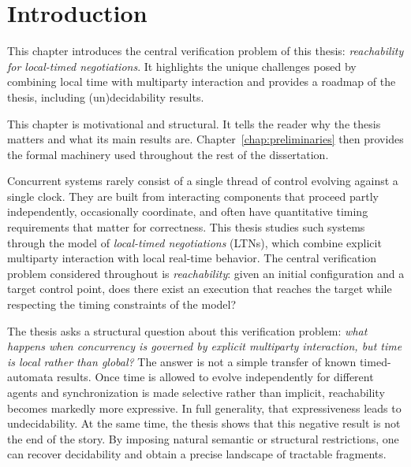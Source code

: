 

\chapter{Introduction}
\label{chap:intro}

\begin{tcolorbox}[width=\textwidth,colback={LightSteelBlue1}]
This chapter introduces the central verification problem of this thesis: \emph{reachability for local-timed negotiations}. It highlights the unique challenges posed by combining local time with multiparty interaction and provides a roadmap of the thesis, including (un)decidability results.
\end{tcolorbox}    

\noindent This chapter is motivational and structural. It tells the reader why the thesis matters and what its main results are. Chapter~\ref{chap:preliminaries} then provides the formal machinery used throughout the rest of the dissertation.

Concurrent systems rarely consist of a single thread of control evolving against a single clock. They are built from interacting components that proceed partly independently, occasionally coordinate, and often have quantitative timing requirements that matter for correctness. This thesis studies such systems through the model of \emph{local-timed negotiations} (LTNs), which combine explicit multiparty interaction with local real-time behavior. The central verification problem considered throughout is \emph{reachability}: given an initial configuration and a target control point, does there exist an execution that reaches the target while respecting the timing constraints of the model?

The thesis asks a structural question about this verification problem: \emph{what happens when concurrency is governed by explicit multiparty interaction, but time is local rather than global?} The answer is not a simple transfer of known timed-automata results. Once time is allowed to evolve independently for different agents and synchronization is made selective rather than implicit, reachability becomes markedly more expressive. In full generality, that expressiveness leads to undecidability. At the same time, the thesis shows that this negative result is not the end of the story. By imposing natural semantic or structural restrictions, one can recover decidability and obtain a precise landscape of tractable fragments.

